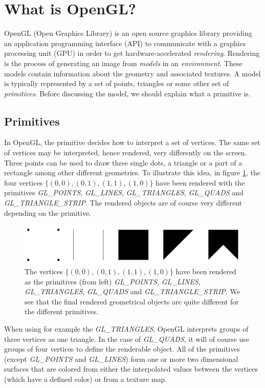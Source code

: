 \section{What is OpenGL?}
\label{sec:opengl}
OpenGL (Open Graphics Library) is an open source graphics library providing an application programming interface (API) to communicate with a graphics processing unit (GPU) in order to get hardware-accelerated \textit{rendering}. Rendering is the process of generating an image from \textit{models} in an \textit{environment}. These models contain information about the geometry and associated textures. A model is typically represented by a set of points, triangles or some other set of \textit{primitives}. Before discussing the model, we should explain what a primitive is.
\subsection{Primitives}
In OpenGL, the primitive decides how to interpret a set of vertices. The same set of vertices may be interpreted, hence rendered, very differently on the screen. Three points can be used to draw three single dots, a triangle or a part of a rectangle among other different geometries. To illustrate this idea, in figure \ref{fig:opengl_primitives}, the four vertices $\{(0,0), (0,1), (1,1), (1,0)\}$ have been rendered with the primitives \textit{GL\_POINTS}, \textit{GL\_LINES}, \textit{GL\_TRIANGLES}, \textit{GL\_QUADS} and \textit{GL\_TRIANGLE\_STRIP}. The rendered objects are of course very different depending on the primitive. 
\begin{figure}[h]
\begin{center}
\includegraphics[width=\textwidth, trim=0cm 0cm 0cm 0cm, clip]{opengl/figures/primitives.png}
\end{center}
\caption{The vertices $\{(0,0), (0,1), (1,1), (1,0)\}$ have been rendered as the primitives (from left) \textit{GL\_POINTS}, \textit{GL\_LINES}, \textit{GL\_TRIANGLES}, \textit{GL\_QUADS} and \textit{GL\_TRIANGLE\_STRIP}. We see that the final rendered geometrical objects are quite different for the different primitives.}
\label{fig:opengl_primitives}
\end{figure}
When using for example the \textit{GL\_TRIANGLES}, OpenGL interprets groups of three vertices as one triangle. In the case of \textit{GL\_QUADS}, it will of course use groups of four vertices to define the renderable object. All of the primitives (except \textit{GL\_POINTS} and \textit{GL\_LINES}) form one or more two dimensional surfaces that are colored from either the interpolated values between the vertices (which have a defined color) or from a texture map.
